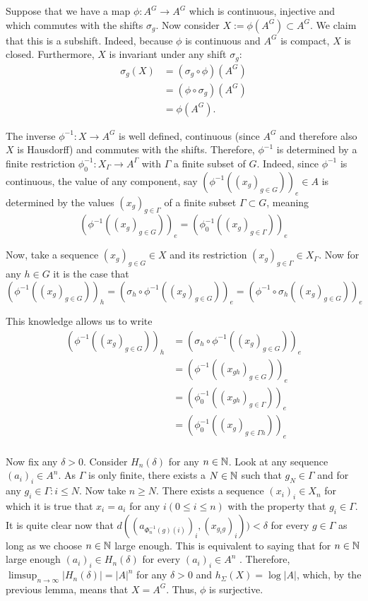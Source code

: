 Suppose that we have a map $\phi: A^G \to A^G$ which is continuous, injective and which commutes with the shifts $\sigma_g$. Now consider $X := \phi(A^G) \subset A^G$. We claim that this is a subshift. Indeed, because $\phi$ is continuous and $A^G$ is compact, $X$ is closed. Furthermore, $X$ is invariant under any shift $\sigma_g$: 
		\begin{align*}
		\sigma_g(X)
		&= (\sigma_g \circ \phi) (A^G) \\
		&= (\phi \circ \sigma_g)(A^G) \\
		&= \phi(A^G).
		\end{align*}
		
The inverse $\phi^{-1}: X \to A^G$ is well defined, continuous (since $A^G$ and therefore also $X$ is Hausdorff) and commutes with the shifts. Therefore,  $\phi^{-1}$ is determined by a finite restriction $\phi^{-1}_0: X_{\Gamma} \to A^{\Gamma}$ with $\Gamma$ a finite subset of $G$. Indeed, since $\phi^{-1}$ is continuous, the value of any component, say $(\phi^{-1}((x_g)_{g \in G}))_e \in A$ is determined by the values $(x_g)_{g \in \Gamma}$ of a finite subset $\Gamma \subset G$, meaning 
		\[
		(\phi^{-1}((x_g)_{g \in G}))_e = (\phi^{-1}_0((x_g)_{g \in \Gamma}))_e
		\]

Now, take a sequence $(x_g)_{g \in G} \in X$ and its restriction $(x_g)_{g \in \Gamma} \in X_{\Gamma}$. Now for any $h \in G$ it is the case that 
		\[
		(\phi^{-1}((x_g)_{g \in G}))_h = (\sigma_h \circ \phi^{-1}((x_g)_{g \in G}))_e  = (\phi^{-1} \circ \sigma_h((x_g)_{g \in G}))_e
		\]

This knowledge allows us to write
		\begin{align*}
		(\phi^{-1}((x_g)_{g \in G}))_h
		&= (\sigma_h \circ \phi^{-1}((x_g)_{g \in G}))_e \\
		&= (\phi^{-1}((x_{gh})_{g \in G}))_e \\
		&= (\phi^{-1}_0((x_{gh})_{g \in \Gamma}))_e \\
		&= (\phi^{-1}_0((x_g)_{g \in \Gamma h}))_e
		\end{align*}
\\
Now fix any $\delta > 0$. Consider $H_n(\delta)$ for any $n \in \mathbb{N}$. Look at any sequence $(a_i)_i \in A^n$. As $\Gamma$ is only finite, there exists a $N \in \mathbb{N}$ such that $g_N \in \Gamma$ and for any $g_i \in \Gamma: i \leq N$. Now take $n \geq N$. There exists a sequence $(x_i)_i \in X_n$ for which it is true that $x_i = a_i$ for any $i(0 \leq i \leq n)$ with the property that $g_i \in \Gamma$. It is quite clear now that $d((a_{\Phi^{-1}_n(g)(i)})_i,(x_{g_i g})_i)) < \delta$ for every $g \in \Gamma$ as long as we choose $n \in \mathbb{N}$ large enough. This is equivalent to saying that for $n \in \mathbb{N}$ large enough $(a_i)_i \in H_n(\delta)$ for every $(a_i)_i \in A^n$ . Therefore, $\limsup_{n \to \infty} |H_n(\delta)| = |A|^{n}$ for any $\delta >0$ and $h_\Sigma(X) = \log |A|$, which, by the previous lemma, means that $X = A^G$. Thus, $\phi$ is surjective.

